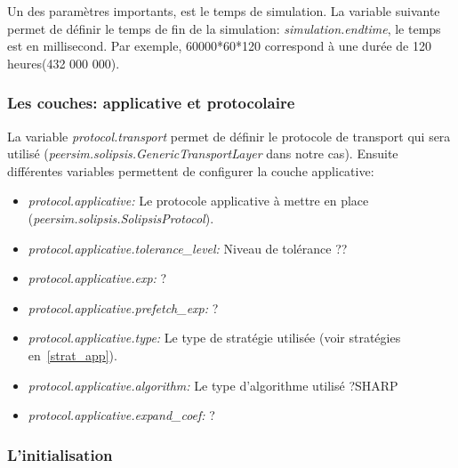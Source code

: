 \documentclass[11pt,a4paper]{article}
\begin{document}
Un des paramètres importants, est le temps de simulation. La variable suivante permet de définir le temps de fin de la simulation: \textit{simulation.endtime}, le temps est en millisecond. Par exemple, 60000*60*120 correspond à une durée de 120 heures(432 000 000). 

\subsubsection{Les couches: applicative et protocolaire}
La variable \textit{protocol.transport} permet de définir le protocole de transport qui sera utilisé (\textit{peersim.solipsis.GenericTransportLayer} dans notre cas). Ensuite différentes variables permettent de configurer la couche applicative:
\begin{itemize}
        \renewcommand{\labelitemi}{$\bullet$}
	\item \textit{protocol.applicative:} Le protocole applicative à mettre en place (\textit{peersim.solipsis.SolipsisProtocol}).
	\item \textit{protocol.applicative.tolerance\_level:} Niveau de tolérance ??
	\item \textit{protocol.applicative.exp:} ?
	\item \textit{protocol.applicative.prefetch\_exp:} ?
	\item \textit{protocol.applicative.type:} Le type de stratégie utilisée (voir stratégies en~\ref{strat_app}).
	\item \textit{protocol.applicative.algorithm:} Le type d'algorithme utilisé ?SHARP
	\item \textit{protocol.applicative.expand\_coef:} ?
\end{itemize}

\subsubsection{L'initialisation}
\end{document}
